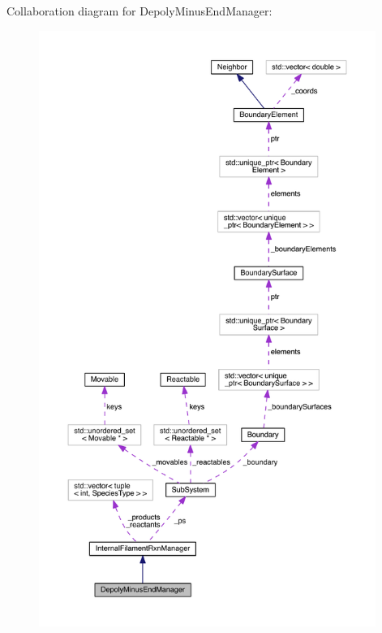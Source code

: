 Collaboration diagram for Depoly\+Minus\+End\+Manager\+:
\nopagebreak
\begin{figure}[H]
\begin{center}
\leavevmode
\includegraphics[height=550pt]{classDepolyMinusEndManager__coll__graph}
\end{center}
\end{figure}

